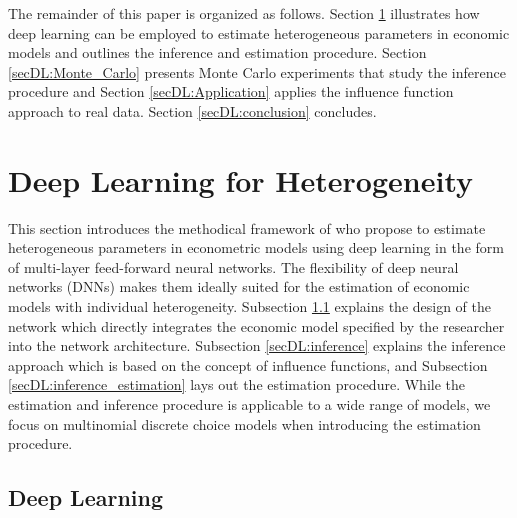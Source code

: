 \documentclass[a4paper, 12pt]{article}
\begin{document}
The remainder of this paper is organized as follows. Section \ref{secDL:deep_learning_logit} illustrates how deep learning can be employed to estimate heterogeneous parameters in economic models and outlines the inference and estimation procedure. Section \ref{secDL:Monte_Carlo} presents  Monte Carlo experiments that study the inference procedure and Section \ref{secDL:Application} applies the influence function approach to real data. Section \ref{secDL:conclusion} concludes.





\section{Deep Learning for Heterogeneity}\label{secDL:deep_learning_logit}

This section introduces the methodical framework of  who propose to estimate heterogeneous parameters in econometric models using deep learning in the form of multi-layer feed-forward neural networks. The flexibility of deep neural networks (DNNs) makes them ideally suited for the estimation of  economic models with individual heterogeneity. Subsection \ref{secDL:network_arch} explains the design of the network which directly integrates the economic model specified by the researcher into the network architecture. Subsection \ref{secDL:inference} explains the inference approach which is based on the concept of influence functions, and Subsection \ref{secDL:inference_estimation} lays out the estimation procedure. While the estimation and inference procedure is applicable to a wide range of models, we focus on multinomial discrete choice models when introducing the estimation procedure.


\subsection{Deep Learning}\label{secDL:network_arch}
\end{document}
